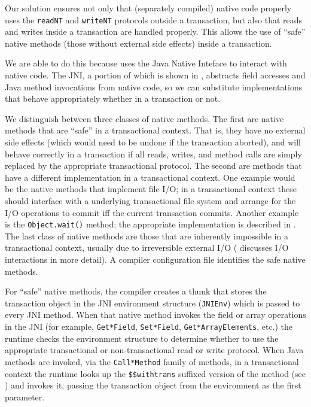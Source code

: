 Our solution ensures not only that (separately compiled) native code
properly uses the \texttt{readNT} and  \texttt{writeNT} protocols
outside a transaction, but also that reads and writes inside a
transaction are handled properly.  This allows the use of ``safe''
native methods (those without external side effects) inside a
transaction. 

We are able to do this because \flex uses the Java Native Inteface
\cite{JNI} to interact with native code.  The JNI, a portion of which
is shown in , abstracts field
accesses and Java method invocations from native code, so we can
substitute implementations that behave appropriately whether in a
transaction or not.

We distinguish between three classes of native methods.  The first are
native methods that are ``safe'' in a transactional context.  That
is, they have no external side effects (which would need to be undone
if the transaction aborted), and will behave correctly in a
transaction if all reads, writes, and method calls are simply replaced
by the appropriate transactional protocol.   The second are methods
that have a different implementation in a transactional context. One
example would be the native methods that implement file I/O; in a
transactional context these should interface with a underlying
transactional file system and arrange for the I/O operations to commit
iff the current transaction commits.  Another example is the
\texttt{Object.wait()} method; the appropriate implementation is
described in .   The last class of native methods
are those that are inherently impossible in a transactional context,
usually due to irreversible external I/O ( discusses I/O
interactions in more detail).  A compiler configuration file
identifies the safe native methods.

For ``safe'' native methods, the \flex compiler creates a thunk that
stores the transaction object in the JNI environment structure
(\texttt{JNIEnv}) which is passed to every JNI method.  When that
native method invokes the field or array operations in the JNI (for
example, \texttt{Get*Field}, \texttt{Set*Field}, \texttt{Get*ArrayElements},
etc.) the runtime checks the environment structure to
determine whether to use the appropriate transactional or
non-transactional read or write protocol.  When Java methods are
invoked, via the \texttt{Call*Method} family of methods, in a
transactional context the runtime looks up the \texttt{\$\$withtrans}
suffixed version of the method (see ) and invokes
it, passing the transaction object from the environment as the first
parameter.

